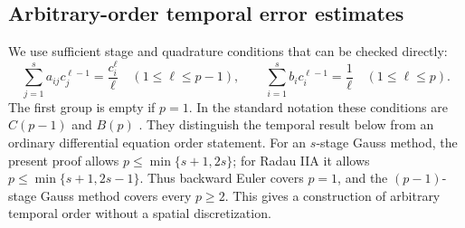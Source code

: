 \documentclass[11pt,a4paper]{article}
\theoremstyle{definition}
\numberwithin{equation}{section}
\begin{document}
\subsection{Arbitrary-order temporal error estimates}
We use sufficient stage and quadrature conditions that can be checked directly:
\begin{equation}\label{eq:ho:moments}
 \sum_{j=1}^s a_{ij}c_j^{\ell-1}=\frac{c_i^\ell}{\ell}
 \quad(1\le\ell\le p-1),\qquad
 \sum_{i=1}^s b_i c_i^{\ell-1}=\frac1\ell
 \quad(1\le\ell\le p).
\end{equation}
The first group is empty if $p=1$. In the standard notation these conditions
are $C(p-1)$ and $B(p)$ \cite{HO_HairerWanner1996,HO_AkrivisLiLi2019}.
They distinguish the temporal result below from an ordinary differential
equation order statement. For an $s$-stage Gauss method, the present proof
allows $p\le\min\{s+1,2s\}$; for Radau IIA it allows
$p\le\min\{s+1,2s-1\}$. Thus backward Euler covers $p=1$, and the
$(p-1)$-stage Gauss method covers every $p\ge2$. This gives a construction of
arbitrary temporal order without a spatial discretization.
\end{document}
